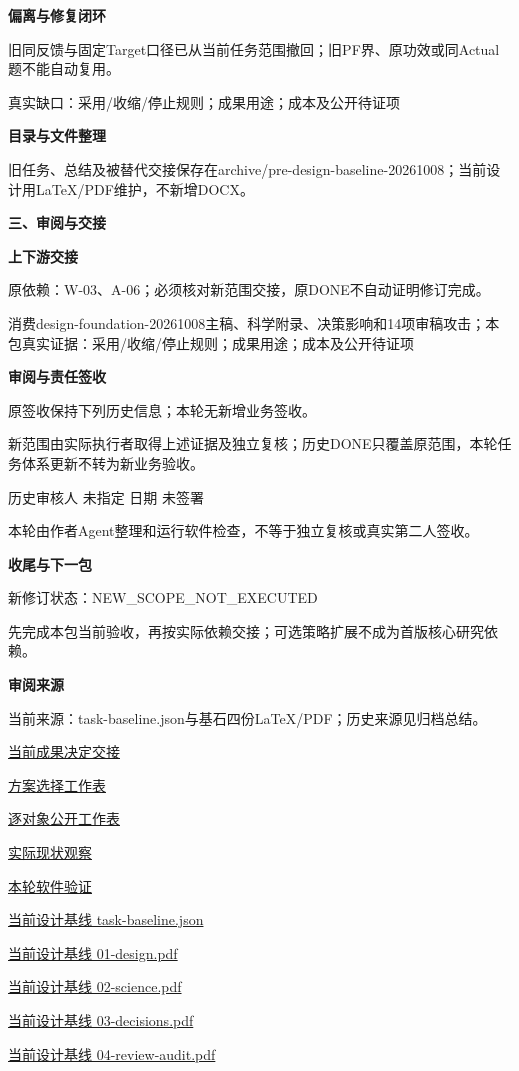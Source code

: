 \documentclass[11pt,a4paper]{article}
\newcommand{\reviewsection}[1]{\par\Needspace{5\baselineskip}\vspace{10pt}\begin{center}{\titlelatin\titlecjk\bfseries\fontsize{14}{20}\selectfont #1}\end{center}}
\newcommand{\reviewsubsection}[1]{\par\Needspace{4\baselineskip}\vspace{4pt}\begin{center}{\titlelatin\titlecjk\bfseries\fontsize{12}{18}\selectfont #1}\end{center}}
\begin{document}
\reviewsubsection{2.3 偏离与修复闭环}
旧同反馈与固定Target口径已从当前任务范围撤回；旧PF界、原功效或同Actual题不能自动复用。


真实缺口：采用/\allowbreak{}收缩/\allowbreak{}停止规则；成果用途；成本及公开待证项


\reviewsubsection{2.4 目录与文件整理}
旧任务、总结及被替代交接保存在archive/\allowbreak{}pre-\allowbreak{}design-\allowbreak{}baseline-\allowbreak{}20261008；当前设计用LaTeX/\allowbreak{}PDF维护，不新增DOCX。


\reviewsection{三、审阅与交接}
\reviewsubsection{3.1 上下游交接}
原依赖：W-\allowbreak{}03、A-\allowbreak{}06；必须核对新范围交接，原DONE不自动证明修订完成。


消费design-\allowbreak{}foundation-\allowbreak{}20261008主稿、科学附录、决策影响和14项审稿攻击；本包真实证据：采用/\allowbreak{}收缩/\allowbreak{}停止规则；成果用途；成本及公开待证项


\reviewsubsection{3.2 审阅与责任签收}
原签收保持下列历史信息；本轮无新增业务签收。


新范围由实际执行者取得上述证据及独立复核；历史DONE只覆盖原范围，本轮任务体系更新不转为新业务验收。


历史审核人 未指定    日期 未签署


本轮由作者Agent整理和运行软件检查，不等于独立复核或真实第二人签收。


\reviewsubsection{3.3 收尾与下一包}
新修订状态：NEW\_\allowbreak{}SCOPE\_\allowbreak{}NOT\_\allowbreak{}EXECUTED


先完成本包当前验收，再按实际依赖交接；可选策略扩展不成为首版核心研究依赖。


\reviewsubsection{3.4 审阅来源}
当前来源：task-\allowbreak{}baseline.json与基石四份LaTeX/\allowbreak{}PDF；历史来源见归档总结。


\href{file:///D:/Agent/srp/agent/tasks/U12-12/outputs/current-decision.md}{当前成果决定交接}


\href{file:///D:/Agent/srp/agent/tasks/U12-12/outputs/decision-workbook.md}{方案选择工作表}


\href{file:///D:/Agent/srp/agent/tasks/U12-12/outputs/publication-workbook.md}{逐对象公开工作表}


\href{file:///D:/Agent/srp/agent/tasks/U12-12/outputs/current-decision.json}{实际现状观察}


\href{file:///D:/Agent/srp/agent/tasks/U12-12/evidence/verification.json}{本轮软件验证}


\href{file:///D:/Agent/srp/agent/design/design-foundation-20261008/task-baseline.json}{当前设计基线 task-\allowbreak{}baseline.json}


\href{file:///D:/Agent/srp/agent/design/design-foundation-20261008/01-design.pdf}{当前设计基线 01-\allowbreak{}design.pdf}


\href{file:///D:/Agent/srp/agent/design/design-foundation-20261008/02-science.pdf}{当前设计基线 02-\allowbreak{}science.pdf}


\href{file:///D:/Agent/srp/agent/design/design-foundation-20261008/03-decisions.pdf}{当前设计基线 03-\allowbreak{}decisions.pdf}


\href{file:///D:/Agent/srp/agent/design/design-foundation-20261008/04-review-audit.pdf}{当前设计基线 04-\allowbreak{}review-\allowbreak{}audit.pdf}
\end{document}
